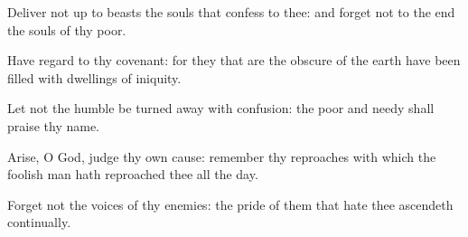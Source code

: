 \item Deliver not up to beasts the souls that confess to thee: and forget not to the end the souls of thy poor.
\item Have regard to thy covenant: for they that are the obscure of the earth have been filled with dwellings of iniquity.
\item Let not the humble be turned away with confusion: the poor and needy shall praise thy name.
\item Arise, O God, judge thy own cause: remember thy reproaches with which the foolish man hath reproached thee all the day.
\item Forget not the voices of thy enemies: the pride of them that hate thee ascendeth continually.